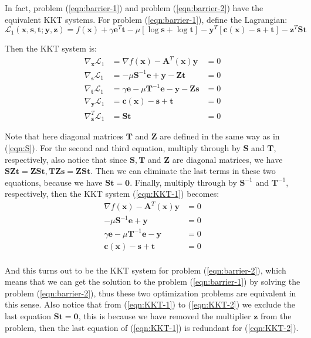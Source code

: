 \documentclass[12pt]{article}
\newcommand{\mb}{\mathbf}
\begin{document}
In fact, problem (\ref{eqn:barrier-1}) and problem (\ref{eqn:barrier-2}) have the equivalent KKT systems. For problem (\ref{eqn:barrier-1}), define the Lagrangian:
%
\begin{equation}
\mathcal{L}_1(\mb{x}, \mb{s}, \mb{t}; \mb{y}, \mb{z}) = f(\mb{x}) + \gamma \mb{e}^T \mb{t} - \mu [\log \mb{s} + \log \mb{t} ] - \mb{y}^T [\mb{c}(\mb{x}) - \mb{s} + \mb{t}] - \mb{z}^T \mb{S} \mb{t}
\end{equation}

Then the KKT system is:
%
\begin{equation}
  \label{eqn:KKT-1}
  \begin{aligned}
    \nabla_\mb{x}\mathcal{L}_1 &= \nabla f(\mb{x}) - \mb{A}^T(\mb{x}) \mb{y} &= 0\\
    \nabla_\mb{s}\mathcal{L}_1 &= - \mu \mb{S}^{-1}\mb{e} + \mb{y} - \mb{Z} \mb{t} &=  0\\
    \nabla_\mb{t}\mathcal{L}_1 &= \gamma \mb{e} - \mu \mb{T}^{-1} \mb{e} - \mb{y} - \mb{Z} \mb{s} &= 0 \\
    \nabla_\mb{y}\mathcal{L}_1 &= \mb{c}(\mb{x}) - \mb{s} + \mb{t} &= 0\\
    \nabla_\mb{z}^T\mathcal{L}_1 &= \mb{S} \mb{t} &= 0
  \end{aligned}
\end{equation}

Note that here diagonal matrices $\mb{T}$ and $\mb{Z}$ are defined in the same way as in (\ref{eqn:S}). For the second and third equation, multiply through by $\mb{S}$ and $\mb{T}$, respectively, also notice that since $\mb{S}, \mb{T}$ and $\mb{Z}$ are diagonal matrices, we have $\mb{S} \mb{Z} \mb{t}= \mb{Z} \mb{S} \mb{t}, \mb{T}\mb{Z} \mb{s} = \mb{Z}\mb{S}\mb{t}$. Then we can eliminate the last terms in these two equations, because we have $\mb{S}\mb{t}=\mb{0}$. Finally, multiply through by $\mb{S}^{-1}$ and $\mb{T}^{-1}$, respectively, then the KKT system (\ref{eqn:KKT-1}) becomes:
%
\begin{equation}
  \label{eqn:KKT-2}
  \begin{aligned}
    \nabla f(\mb{x}) - \mb{A}^T(\mb{x}) \mb{y} &= 0\\
    - \mu \mb{S}^{-1} \mb{e} + \mb{y}  &=  0\\
    \gamma \mb{e} - \mu \mb{T}^{-1} \mb{e} - \mb{y} &= 0 \\
    \mb{c}(\mb{x}) - \mb{s} + \mb{t} &= 0\\
  \end{aligned}
\end{equation}

And this turns out to be the KKT system for problem (\ref{eqn:barrier-2}), which means that we can get the solution to the problem (\ref{eqn:barrier-1}) by solving the problem (\ref{eqn:barrier-2}), thus these two optimization problems are equivalent in this sense. Also notice that from (\ref{eqn:KKT-1}) to (\ref{eqn:KKT-2}) we exclude the last equation $\mb{S}\mb{t} = \mb{0}$, this is because we have removed the multiplier $\mb{z}$ from the problem, then the last equation of (\ref{eqn:KKT-1}) is redundant for (\ref{eqn:KKT-2}).
\end{document}

